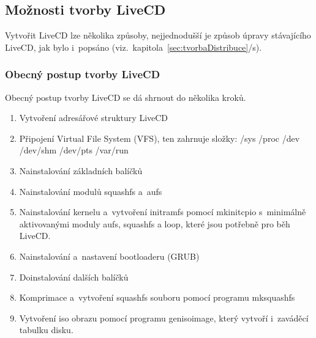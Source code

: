 \documentclass[a4paper,12pt]{article}
\newcommand{\odkazNaKapitolu}[1]{(viz.~kapitola~\ref{#1}/s\pageref{#1})}
\begin{document}
\subsection{Možnosti tvorby LiveCD}
Vytvořit LiveCD lze několika způsoby, nejjednodušší je způsob úpravy stávajícího LiveCD, jak bylo i~popsáno \odkazNaKapitolu{sec:tvorbaDistribuce}. 

\subsubsection{Obecný postup tvorby LiveCD}
Obecný postup tvorby LiveCD se dá shrnout do několika kroků.
\begin{enumerate}
 \item Vytvoření adresářové struktury LiveCD
 \item Připojení Virtual File System (VFS), ten zahrnuje složky: /sys /proc /dev /dev/shm /dev/pts /var/run
 \item Nainstalování základních balíčků
 \item Nainstalování modulů squashfs a~aufs
 \item Nainstalování kernelu a~vytvoření initramfs pomocí mkinitcpio s~minimálně aktivovanými moduly aufs, squashfs a loop, které jsou potřebně pro běh LiveCD.
 \item Nainstalování a~nastavení bootloaderu (GRUB)
 \item Doinstalování dalších balíčků
 \item Komprimace a~vytvoření squashfs souboru pomocí programu mksquashfs
 \item Vytvoření iso obrazu pomocí programu genisoimage, který vytvoří i~zaváděcí tabulku disku.
\end{enumerate}
\end{document}
